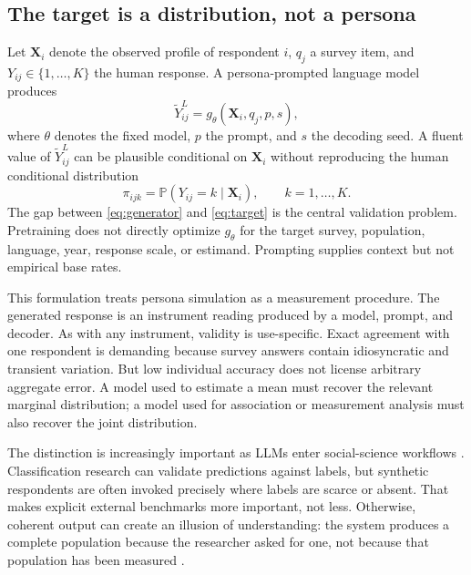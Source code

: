 \documentclass[10pt,twocolumn]{article}
\newcommand{\Prob}{\mathbb{P}}
\begin{document}
\subsection{The target is a distribution, not a persona}

Let $\bm X_i$ denote the observed profile of respondent $i$, $q_j$ a survey item, and
$Y_{ij}\in\{1,\ldots,K\}$ the human response. A persona-prompted language model produces
\begin{equation}
  \widetilde{Y}^{L}_{ij}
  =
  g_{\theta}\!\left(\bm X_i,q_j,p,s\right),
  \label{eq:generator}
\end{equation}
where $\theta$ denotes the fixed model, $p$ the prompt, and $s$ the decoding seed. A fluent value of
$\widetilde{Y}^{L}_{ij}$ can be plausible conditional on $\bm X_i$ without reproducing the human
conditional distribution
\begin{equation}
  \pi_{ijk}
  =
  \Prob(Y_{ij}=k\mid\bm X_i),
  \qquad k=1,\ldots,K.
  \label{eq:target}
\end{equation}
The gap between \cref{eq:generator} and \cref{eq:target} is the central validation problem.
Pretraining does not directly optimize $g_{\theta}$ for the target survey, population, language,
year, response scale, or estimand. Prompting supplies context but not empirical base rates.

This formulation treats persona simulation as a measurement procedure. The generated response is an
instrument reading produced by a model, prompt, and decoder. As with any instrument, validity is
use-specific. Exact agreement with one respondent is demanding because survey answers contain
idiosyncratic and transient variation. But low individual accuracy does not license arbitrary
aggregate error. A model used to estimate a mean must recover the relevant marginal distribution; a
model used for association or measurement analysis must also recover the joint distribution.

The distinction is increasingly important as LLMs enter social-science workflows
\parencite{demszky2023psychology,chae2025classification}. Classification research can validate
predictions against labels, but synthetic respondents are often invoked precisely where labels are
scarce or absent. That makes explicit external benchmarks more important, not less. Otherwise,
coherent output can create an illusion of understanding: the system produces a complete population
because the researcher asked for one, not because that population has been measured
\parencite{messeri2024illusions}.
\end{document}
